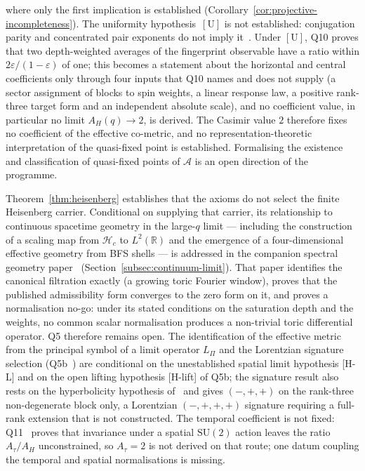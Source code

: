 \documentclass[11pt,a4paper]{article}
\begin{document}
      where only the first implication is established (Corollary~\ref{cor:projective-incompleteness}).
      The uniformity hypothesis~$[\mathrm{U}]$ is not established: conjugation parity and
      concentrated pair exponents do not imply it~\cite{Beau2026q10}.
      Under $[\mathrm{U}]$, Q10 proves that two depth-weighted averages of the fingerprint
      observable have a ratio within $2\varepsilon/(1-\varepsilon)$ of one; this becomes a
      statement about the horizontal and central coefficients only through four inputs that
      Q10 names and does not supply (a sector assignment of blocks to spin weights, a linear
      response law, a positive rank-three target form and an independent absolute scale), and
      no coefficient value, in particular no limit $A_H(q) \to 2$, is derived.
      The Casimir value $2$ therefore fixes no coefficient of the effective co-metric, and no
      representation-theoretic interpretation of the quasi-fixed point is established.
      Formalising the existence and classification of quasi-fixed points of
      $\mathcal{A}$ is an open direction of the programme.

      Theorem~\ref{thm:heisenberg} establishes that the axioms do not select the
      finite Heisenberg carrier.
      Conditional on supplying that carrier, its relationship to continuous
      spacetime geometry in the large-$q$ limit — including the construction of
      a scaling map from $\mathcal{H}_c$ to $L^2(\mathbb{R})$ and the emergence
      of a four-dimensional effective geometry from BFS shells —
      is addressed in the companion spectral geometry paper~\cite{Beau2026q5a}
      (Section~\ref{subsec:continuum-limit}).
      That paper identifies the canonical filtration exactly (a growing
      toric Fourier window), proves that the published admissibility form converges to
      the zero form on it, and proves a normalisation no-go: under its stated conditions on the
      saturation depth and the weights, no common scalar normalisation produces a non-trivial
      toric differential operator.
      Q5 therefore remains open.
      The identification of the effective metric from the principal symbol of a limit
      operator $L_\Pi$ and the Lorentzian signature selection (Q5b~\cite{Beau2026q5b})
      are conditional on the unestablished spatial limit hypothesis [H-L] and on the open lifting
      hypothesis [H-lift] of Q5b; the signature result also rests on the hyperbolicity hypothesis
      of~\cite{Beau2026c} and gives $(-,+,+)$ on the rank-three non-degenerate block only, a Lorentzian
      $(-,+,+,+)$ signature requiring a full-rank extension that is not constructed.
      The temporal coefficient is not fixed: Q11~\cite{Beau2026q11} proves that invariance under a
      spatial $\mathrm{SU}(2)$ action leaves the ratio $A_\tau/A_H$ unconstrained, so $A_\tau = 2$
      is not derived on that route; one datum coupling the temporal and spatial normalisations
      is missing.
\end{document}
